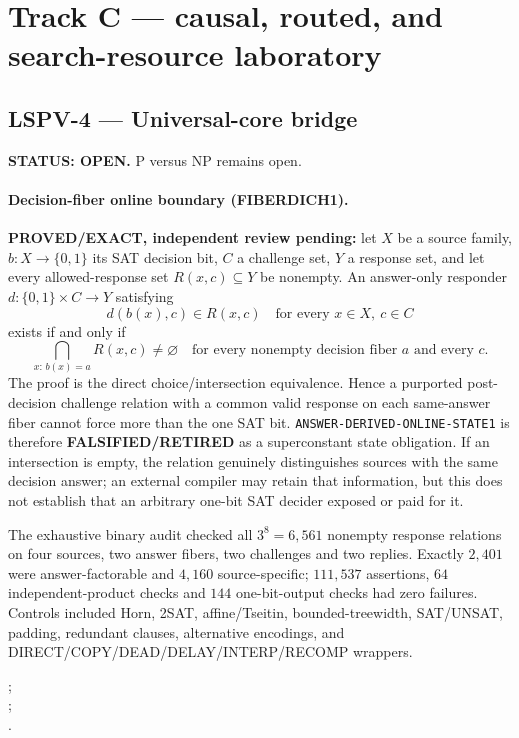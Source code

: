 \documentclass[11pt]{article}
\begin{document}
\section{Track C --- causal, routed, and search-resource laboratory}

\subsection{LSPV-4 --- Universal-core bridge}
\textbf{STATUS: OPEN.} P versus NP remains open.

\paragraph{Decision-fiber online boundary (FIBERDICH1).}
\textbf{PROVED/EXACT, independent review pending:} let \(X\) be a source
family, \(b:X\to\{0,1\}\) its SAT decision bit, \(C\) a challenge set, \(Y\)
a response set, and let every allowed-response set
\(R(x,c)\subseteq Y\) be nonempty.  An answer-only responder
\(d:\{0,1\}\times C\to Y\) satisfying
\[
 d(b(x),c)\in R(x,c)\quad\text{for every }x\in X,\ c\in C
\]
exists if and only if
\[
 \bigcap_{x:\,b(x)=a}R(x,c)\ne\varnothing
 \quad\text{for every nonempty decision fiber }a\text{ and every }c.
\]
The proof is the direct choice/intersection equivalence.  Hence a purported
post-decision challenge relation with a common valid response on each
same-answer fiber cannot force more than the one SAT bit.
\texttt{ANSWER-DERIVED-ONLINE-STATE1} is therefore
\textbf{FALSIFIED/RETIRED} as a superconstant state obligation.  If an
intersection is empty, the relation genuinely distinguishes sources with the
same decision answer; an external compiler may retain that information, but
this does not establish that an arbitrary one-bit SAT decider exposed or paid
for it.

The exhaustive binary audit checked all \(3^8=6{,}561\) nonempty response
relations on four sources, two answer fibers, two challenges and two replies.
Exactly \(2{,}401\) were answer-factorable and \(4{,}160\) source-specific;
\(111{,}537\) assertions, \(64\) independent-product checks and \(144\)
one-bit-output checks had zero failures.  Controls included Horn, 2SAT,
affine/Tseitin, bounded-treewidth, SAT/UNSAT, padding, redundant clauses,
alternative encodings, and DIRECT/COPY/DEAD/DELAY/INTERP/RECOMP wrappers.

;\\
;\\
.
\end{document}
